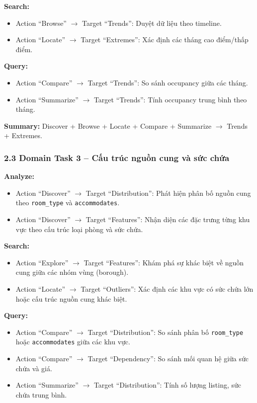 \textbf{Search:} 
\begin{itemize}
    \item Action ``Browse'' $\rightarrow$ Target ``Trends'': Duyệt dữ liệu theo timeline. 
    \item Action ``Locate'' $\rightarrow$ Target ``Extremes'': Xác định các tháng cao điểm/thấp điểm.
\end{itemize}

\textbf{Query:} 
\begin{itemize}
    \item Action ``Compare'' $\rightarrow$ Target ``Trends'': So sánh occupancy giữa các tháng. 
    \item Action ``Summarize'' $\rightarrow$ Target ``Trends'': Tính occupancy trung bình theo tháng.
\end{itemize}

\textbf{Summary:} Discover + Browse + Locate + Compare + Summarize $\rightarrow$ Trends + Extremes.

\subsubsection*{2.3 Domain Task 3 -- Cấu trúc nguồn cung và sức chứa}

\textbf{Analyze:} 
\begin{itemize}
    \item Action ``Discover'' $\rightarrow$ Target ``Distribution'': Phát hiện phân bố nguồn cung theo \texttt{room\_type} và \texttt{accommodates}. 
    \item Action ``Discover'' $\rightarrow$ Target ``Features'': Nhận diện các đặc trưng từng khu vực theo cấu trúc loại phòng và sức chứa.
\end{itemize}

\textbf{Search:} 
\begin{itemize}
    \item Action ``Explore'' $\rightarrow$ Target ``Features'': Khám phá sự khác biệt về nguồn cung giữa các nhóm vùng (borough). 
    \item Action ``Locate'' $\rightarrow$ Target ``Outliers'': Xác định các khu vực có sức chứa lớn hoặc cấu trúc nguồn cung khác biệt.
\end{itemize}

\textbf{Query:} 
\begin{itemize}
    \item Action ``Compare'' $\rightarrow$ Target ``Distribution'': So sánh phân bố \texttt{room\_type} hoặc \texttt{accommodates} giữa các khu vực. 
    \item Action ``Compare'' $\rightarrow$ Target ``Dependency'': So sánh mối quan hệ giữa sức chứa và giá. 
    \item Action ``Summarize'' $\rightarrow$ Target ``Distribution'': Tính số lượng listing, sức chứa trung bình.
\end{itemize}

